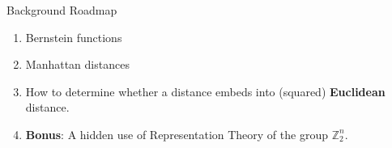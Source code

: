 \begin{frame}{Background Roadmap}
  \begin{enumerate} 
  \item {\color{blue}Bernstein functions}
  \item Manhattan distances
  \item How to determine whether a distance embeds into (squared)
  \textbf{Euclidean} distance.
  \item \textbf{Bonus}: A hidden use of Representation Theory of the
  group $\mathbb{Z}_2^n$.

  \end{enumerate}
\end{frame}

